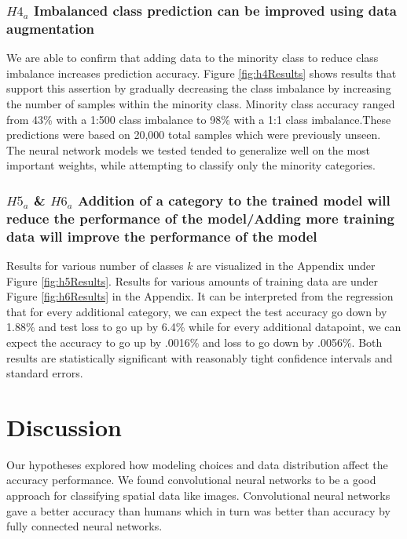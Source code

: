 \documentclass[11pt]{article}
\begin{document}
\subsubsection{$H4_a$\: Imbalanced class prediction can be improved using
  data augmentation}

We are able to confirm that adding data to the minority class to reduce
class imbalance increases prediction accuracy. Figure \ref{fig:h4Results}
shows results that support this assertion by gradually decreasing the class
imbalance by increasing the number of samples within the minority class.
Minority class accuracy ranged from 43\% with a 1:500 class imbalance to
98\% with a 1:1 class imbalance.These predictions were based on 20,000 total
samples which were previously unseen. The neural network models we
tested tended to generalize well on the most important weights, while
attempting to classify only the minority categories.

\subsubsection{$H5_a$ \& $H6_a$\: Addition of a category to the trained model
  will reduce the performance of the model/Adding more training data will
  improve the performance of the model}

Results for various number of classes $k$ are visualized in the Appendix
under Figure \ref{fig:h5Results}. Results for various amounts of training
data are under Figure \ref{fig:h6Results} in the Appendix. It can be
interpreted from the regression that for every additional category,
we can expect the test accuracy go down by 1.88\% and test loss to go up by
6.4\% while for every additional datapoint, we can expect the accuracy to go
up by .0016\% and loss to go down by .0056\%. Both results are statistically
significant with reasonably tight confidence intervals and standard errors.

\section{Discussion}

Our hypotheses explored how modeling choices and data distribution affect
the accuracy performance. We found convolutional neural networks to be a
good approach for classifying spatial data like images. Convolutional neural
networks gave a better accuracy than humans which in turn was better than
accuracy by fully connected neural networks. 
\end{document}
